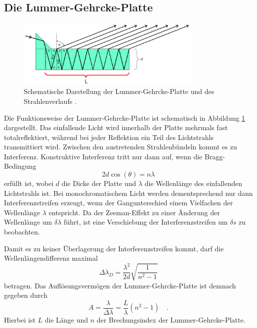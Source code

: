 \subsection*{Die Lummer-Gehrcke-Platte}
\FloatBarrier
\begin{figure}
\centering
\includegraphics[width=0.8\textwidth]{dieguteGehrke.png}
\caption{Schematische Darstellung der Lummer-Gehrcke-Platte und des Strahlenverlaufs \cite{quelle02}.}
\label{fig:tfig6}
\end{figure}
\FloatBarrier
Die Funktionsweise der Lummer-Gehrcke-Platte ist schematisch in Abbildung \ref{fig:tfig6} dargestellt. Das einfallende Licht wird innerhalb der Platte mehrmals fast totalreflektiert,
während bei jeder Reflektion ein Teil des Lichtstrahls transmittiert wird. Zwischen den austretenden Strahlenbündeln kommt es zu Interferenz. Konstruktive Interferenz tritt nur dann
auf, wenn die Bragg-Bedingung
\begin{equation}
2d \cos(\theta) = n \lambda
\end{equation}
erfüllt ist, wobei $d$ die Dicke der Platte und $\lambda$ die Wellenlänge des einfallenden Lichtstrahls ist.
Bei monochromatischem Licht werden dementsprechend nur dann Interferenzstreifen erzeugt, wenn der Gangunterschied einem Vielfachen der Wellenlänge $\lambda$ entspricht. Da der Zeeman-Effekt zu einer 
Änderung der Wellenlänge um $\delta \lambda$ führt, ist eine Verschiebung der Interferenzstreifen um $\delta s$ zu beobachten.

Damit es zu keiner Überlagerung der Interferenzstreifen kommt, darf die Wellenlängendifferenz maximal
\begin{equation}
    \label{eq:lambda_d}
\Delta \lambda_D = \frac{\lambda ^2}{2d}\sqrt{\frac{1}{n^2-1}}
\end{equation}
betragen. Das Auflösungsvermögen der Lummer-Gehrcke-Platte ist demnach gegeben durch
\begin{equation}
    \label{eq:a}
A = \frac{\lambda}{\Delta \lambda} = \frac{L}{\lambda}(n^2-1) \quad  .
\end{equation}
Hierbei ist $L$ die Länge und $n$ der Brechungsindex der Lummer-Gehrcke-Platte.


